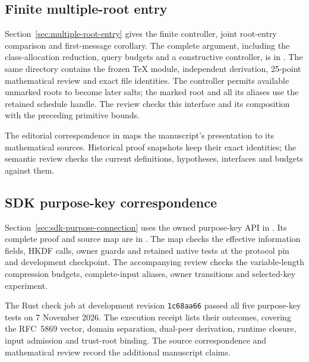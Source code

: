\subsection{Finite multiple-root entry}

Section~\ref{sec:multiple-root-entry} gives the finite controller, joint
root-entry comparison and first-message corollary. The complete argument,
including the class-allocation reduction, query budgets and a constructive
controller, is in
.
The same directory contains the frozen TeX module, independent derivation,
25-point mathematical review and exact file identities. The controller
permits available unmarked roots to become later salts; the marked root and
all its aliases use the retained schedule handle. The review checks this
interface and its composition with the preceding primitive bounds.

The editorial correspondence in 
maps the manuscript's presentation to its mathematical sources. Historical
proof snapshots keep their exact identities; the semantic review checks the
current definitions, hypotheses, interfaces and budgets against them.

\subsection{SDK purpose-key correspondence}

Section~\ref{sec:sdk-purpose-connection} uses the owned purpose-key API in
\href{https://github.com/billlza/q-periapt/blob/228c944fc476e3e57d6c08063cacb19bca5b360e/crates/q-periapt-sdk/src/purpose.rs}{}.
Its complete proof and source map are in
. The map checks the effective
information fields, HKDF calls, owner guards and retained native tests at
the protocol pin and development checkpoint. The accompanying review
checks the variable-length compression budgets, complete-input aliases,
owner transitions and selected-key experiment.

The Rust check job at development revision \texttt{1c68aa66} passed all
five purpose-key tests on 7 November 2026. The execution receipt lists their
outcomes, covering the RFC~5869 vector, domain separation, dual-peer
derivation, runtime closure, input admission and trust-root binding.
The source correspondence and mathematical review record the additional
manuscript claims.

